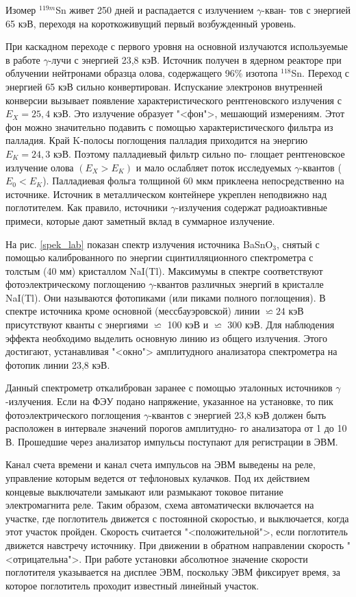 \documentclass[a4paper, 12pt]{article}
\begin{document}
	Изомер $^{119m}$Sn живет 250
	дней и распадается с излучением $ \gamma $-кван-
	тов с энергией 65 кэВ, переходя на короткоживущий первый возбужденный уровень.

	При каскадном переходе с первого
	уровня на основной излучаются используемые в работе $ \gamma $-лучи с энергией 23,8 кэВ.
	Источник получен в ядерном реакторе при
	облучении нейтронами образца олова, содержащего 96\% изотопа
	$ ^{118} $Sn. Переход с энергией 65 кэВ сильно конвертирован. Испускание электронов внутренней конверсии вызывает появление характеристического рентгеновского излучения с $ E_X = 25,4 $ кэВ. Это излучение образует "<фон">, мешающий измерениям. Этот фон можно значительно подавить с помощью характеристического фильтра
	из палладия. Край K-полосы поглощения палладия приходится на
	энергию $ E_K = 24,3 $ кэВ. Поэтому палладиевый фильтр сильно по-
	глощает рентгеновское излучение олова $ (E_X > E_K) $ и мало ослабляет поток исследуемых $ \gamma $-квантов ($ E_0 < E_K $). Палладиевая фольга
	толщиной 60 мкм приклеена непосредственно на источнике. Источник в металлическом контейнере укреплен неподвижно над поглотителем. Как правило, источники $ \gamma $-излучения содержат радиоактивные примеси, которые дают заметный вклад в суммарное излучение.

	На рис. \ref{spek_lab} показан спектр излучения источника BaSnO$_3 $, снятый с помощью калиброванного по энергии сцинтилляционного спектрометра с толстым (40 мм) кристаллом NaI(Tl). Максимумы в спектре
	соответствуют фотоэлектрическому поглощению $ \gamma $-квантов различных энергий в кристалле NaI(Tl). Они называются фотопиками (или
	пиками полного поглощения). В спектре источника кроме основной
	(мессбауэровской) линии $ \backsimeq 24 $ кэВ присутствуют кванты с энергиями $ \backsimeq $ 100 кэВ и $ \backsimeq  $ 300 кэВ. Для наблюдения эффекта необходимо выделить основную линию из общего излучения. Этого достигают, устанавливая "<окно"> амплитудного анализатора спектрометра на фотопик линии 23,8 кэВ.

	Данный спектрометр откалиброван заранее с помощью эталонных
	источников $ \gamma $-излучения. Если на ФЭУ подано напряжение, указанное на установке, то пик фотоэлектрического поглощения $ \gamma $-квантов с энергией 23,8 кэВ
	должен быть расположен в интервале значений порогов амплитудно-
	го анализатора от 1 до 10 В. Прошедшие через анализатор импульсы
	поступают для регистрации в ЭВМ.

	Канал счета времени и канал счета импульсов на ЭВМ выведены
	на реле, управление которым ведется от тефлоновых кулачков. Под их
	действием концевые выключатели замыкают или размыкают токовое
	питание электромагнита реле. Таким образом, схема автоматически
	включается на участке, где поглотитель движется с постоянной скоростью, и выключается, когда этот участок пройден. Скорость считается "<положительной">, если поглотитель движется навстречу источнику.
	При движении в обратном направлении скорость "<отрицательна">. При
	работе установки абсолютное значение скорости поглотителя указывается на дисплее ЭВМ, поскольку ЭВМ фиксирует время, за которое
	поглотитель проходит известный линейный участок.
\end{document}
